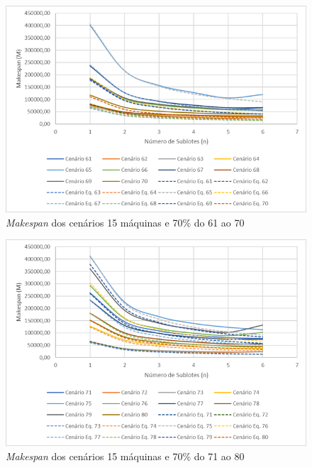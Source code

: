 \begin{figure}[H]
    \centering
     \includegraphics[width=13cm]{Apendices/Figuras/15m70_61-70.png}
     \caption{\textit{Makespan} dos cenários 15 máquinas e 70\% do 61 ao 70}
    \label{fig:15m70_61-70}
\end{figure}

\begin{figure}[H]
    \centering
     \includegraphics[width=13cm]{Apendices/Figuras/15m70_71-80.png}
     \caption{\textit{Makespan} dos cenários 15 máquinas e 70\% do 71 ao 80}
    \label{fig:15m70_71-80}
\end{figure}

